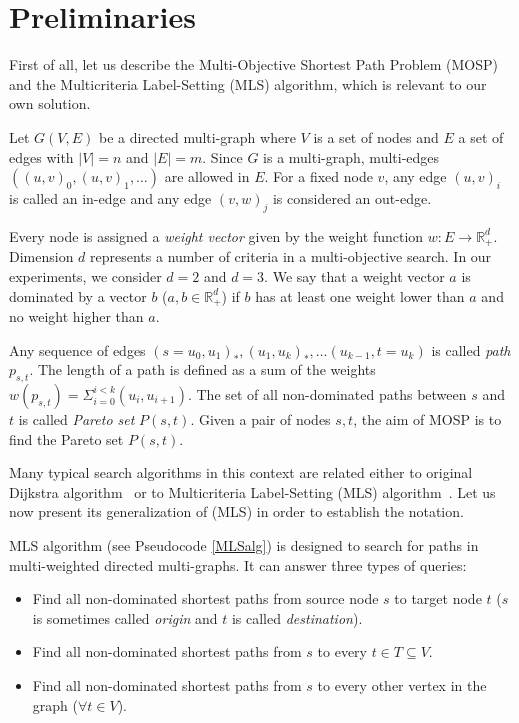 
\section{Preliminaries}
\label{secPreliminaries}

First of all, let us describe the Multi-Objective Shortest Path Problem (MOSP) and the Multicriteria Label-Setting (MLS) algorithm, which is relevant to our own solution.

Let $G(V,E)$ be a directed multi-graph where $V$ is a set of nodes and $E$ a set
of edges with $|V| = n$ and $|E| = m$. Since $G$ is a multi-graph, multi-edges
$((u,v)_0,(u,v)_1,\dots)$ are allowed in $E$. For a fixed node $v$, any edge $(u,v)_i$ is called an in-edge and any edge $(v,w)_j$ is considered an out-edge.

Every node is assigned a \emph{weight vector} given by the weight function $w: E \rightarrow \mathbb{R}_+^d$. Dimension $d$ represents a number of criteria in a multi-objective search. 
In our experiments, we consider $d=2$ and $d=3$.
We say that a weight vector $a$ is dominated by a vector $b$ ($a,b \in \mathbb{R}_+^d$) if
$b$ has at least one weight lower than $a$ and no weight higher than $a$. 

Any sequence of edges $(s \! = \! u_0,u_1)_*,(u_1,u_k)_*,\dots(u_{k-1},t \! = \! u_k)$ is called
\emph{path} $p_{s,t}$. The length of a path is defined as a sum of the weights 
$w(p_{s,t}) = \Sigma_{i=0}^{i<k} (u_i,u_{i+1})$. The set of all non-dominated paths between $s$ and $t$ is called {\em Pareto set}
$P(s,t)$. Given a pair of nodes $s,t$, the aim of MOSP is to find the Pareto set $P(s,t)$.

\vskip 5mm

Many typical search algorithms in this context are related either to original Dijkstra algorithm~\cite{dijkstra1959note} or to Multicriteria Label-Setting (MLS) algorithm~\cite{martins1984multicriteria}. Let us now present its generalization of (MLS) in order to establish the notation.

MLS algorithm (see Pseudocode \ref{MLSalg}) is designed to search for paths in multi-weighted directed multi-graphs. It can answer three types of queries:
\begin{itemize}
\item Find all non-dominated shortest paths from source node $s$ to target node $t$ ($s$ is sometimes called {\em origin} and $t$ is called {\em destination}).
\item Find all non-dominated shortest paths from $s$ to every $t \in T \subseteq V$.
\item Find all non-dominated shortest paths from $s$ to every other vertex in the graph ($\forall t \in V$).
\end{itemize}

